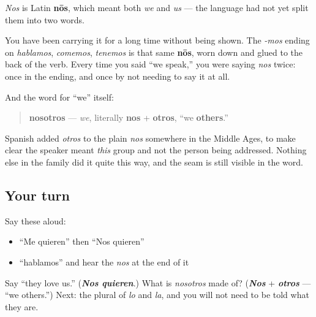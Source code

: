 \begin{cousinweb}
\emph{Nos} is Latin \textbf{nōs}, which meant both \emph{we} and \emph{us} — the language had not yet split them into two words.

You have been carrying it for a long time without being shown. The \emph{-mos} ending on \emph{hablamos}, \emph{comemos}, \emph{tenemos} is that same \textbf{nōs}, worn down and glued to the back of the verb. Every time you said \textquotedblleft{}we speak,\textquotedblright{} you were saying \emph{nos} twice: once in the ending, and once by not needing to say it at all.

And the word for \textquotedblleft{}we\textquotedblright{} itself:

\begin{quote}
\textbf{nosotros} — \emph{we}, literally \textbf{nos} + \textbf{otros}, \textquotedblleft{}we \textbf{others}.\textquotedblright{}
\end{quote}

Spanish added \emph{otros} to the plain \emph{nos} somewhere in the Middle Ages, to make clear the speaker meant \emph{this} group and not the person being addressed. Nothing else in the family did it quite this way, and the seam is still visible in the word.
\end{cousinweb}

\subsection*{Your turn}
Say these aloud:

\begin{itemize}
\raggedright
  \item \textquotedblleft{}Me quieren\textquotedblright{} then \textquotedblleft{}Nos quieren\textquotedblright{}
  \item \textquotedblleft{}hablamos\textquotedblright{} and hear the \emph{nos} at the end of it
\end{itemize}

\begin{tcolorbox}[breakable,colback=teal!4,colframe=teal!35!black,title={Before you move on}]
Say \textquotedblleft{}they love us.\textquotedblright{} (\emph{\textbf{Nos quieren}}.) What is \emph{nosotros} made of? (\emph{\textbf{Nos}} + \emph{\textbf{otros}} — \textquotedblleft{}we others.\textquotedblright{}) Next: the plural of \emph{lo} and \emph{la}, and you will not need to be told what they are.
\end{tcolorbox}
